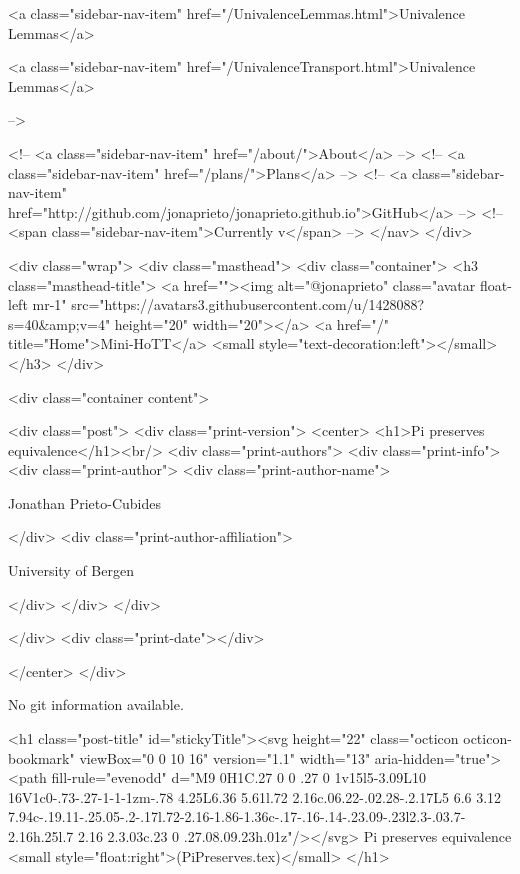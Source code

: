           <a class="sidebar-nav-item" href="/UnivalenceLemmas.html">Univalence Lemmas</a>
        
      
    
      
        
          <a class="sidebar-nav-item" href="/UnivalenceTransport.html">Univalence Lemmas</a>
        
      
     -->

    <!-- <a class="sidebar-nav-item" href="/about/">About</a> -->
    <!-- <a class="sidebar-nav-item" href="/plans/">Plans</a> -->
    <!-- <a class="sidebar-nav-item" href="http://github.com/jonaprieto/jonaprieto.github.io">GitHub</a> -->
    <!-- <span class="sidebar-nav-item">Currently v</span> -->
  </nav>
</div>

    <div class="wrap">
      <div class="masthead">
        <div class="container">
          <h3 class="masthead-title">
            <a href=""><img alt="@jonaprieto" class="avatar float-left mr-1" src="https://avatars3.githubusercontent.com/u/1428088?s=40&amp;v=4" height="20" width="20"></a>
            <a href="/" title="Home">Mini-HoTT</a>
            <small style="text-decoration:left"></small>
          </h3>
        </div>
      
      <div class="container content">
        







<div class="post">
  <div class="print-version">
    <center>
      <h1>Pi preserves equivalence</h1><br/>
        <div class="print-authors">
          <div class="print-info">
            <div class="print-author">
              <div class="print-author-name">
                
                  Jonathan Prieto-Cubides
                
              </div>
              <div class="print-author-affiliation">
                
                  University of Bergen
                
                </div>
            </div>
          </div>
          
          
        </div>
        <div class="print-date"></div>
        
        
    </center>
  </div>

  
  No git information available.
  

  <h1 class="post-title" id="stickyTitle"><svg height="22" class="octicon octicon-bookmark" viewBox="0 0 10 16" version="1.1" width="13" aria-hidden="true"><path fill-rule="evenodd" d="M9 0H1C.27 0 0 .27 0 1v15l5-3.09L10 16V1c0-.73-.27-1-1-1zm-.78 4.25L6.36 5.61l.72 2.16c.06.22-.02.28-.2.17L5 6.6 3.12 7.94c-.19.11-.25.05-.2-.17l.72-2.16-1.86-1.36c-.17-.16-.14-.23.09-.23l2.3-.03.7-2.16h.25l.7 2.16 2.3.03c.23 0 .27.08.09.23h.01z"/></svg> Pi preserves equivalence <small style="float:right">(PiPreserves.tex)</small>
  </h1>

